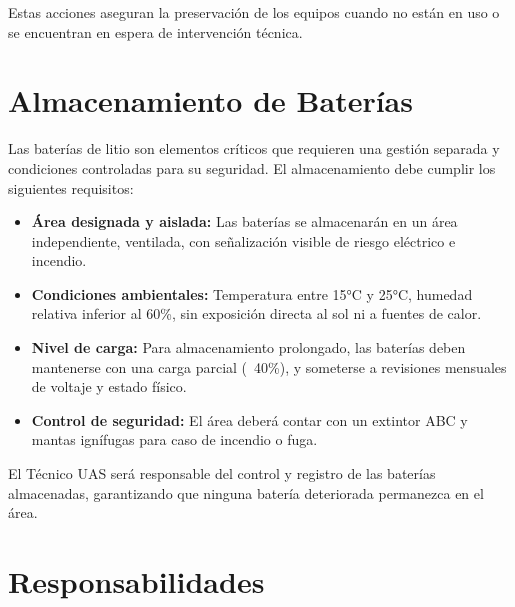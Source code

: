Estas acciones aseguran la preservación de los equipos cuando no están en uso o se encuentran en espera de intervención técnica.


\section{Almacenamiento de Baterías}
Las baterías de litio son elementos críticos que requieren una gestión separada y condiciones controladas para su seguridad. El almacenamiento debe cumplir los siguientes requisitos:

\begin{itemize}
    \item \textbf{Área designada y aislada:} Las baterías se almacenarán en un área independiente, ventilada, con señalización visible de riesgo eléctrico e incendio.

    \item \textbf{Condiciones ambientales:} Temperatura entre 15°C y 25°C, humedad relativa inferior al 60\%, sin exposición directa al sol ni a fuentes de calor.

    \item \textbf{Nivel de carga:} Para almacenamiento prolongado, las baterías deben mantenerse con una carga parcial (~40\%), y someterse a revisiones mensuales de voltaje y estado físico.

    \item \textbf{Control de seguridad:} El área deberá contar con un extintor ABC y mantas ignífugas para caso de incendio o fuga.
\end{itemize}

El Técnico UAS será responsable del control y registro de las baterías almacenadas, garantizando que ninguna batería deteriorada permanezca en el área.

\section{Responsabilidades}

